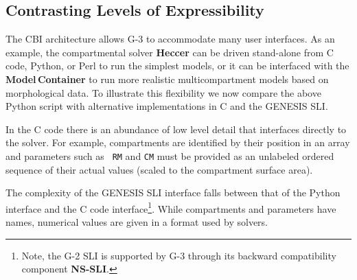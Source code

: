 \documentclass[10pt]{article}
\begin{document}
\subsection*{Contrasting Levels of Expressibility}

The CBI architecture allows G-3 to accommodate many user
interfaces.  As an example, the compartmental solver {\bf Heccer} can be driven
stand-alone from C code, Python, or Perl to run the simplest
models, or it can be interfaced with the {\bf Model\,Container} to
run more realistic multicompartment models based on morphological
data. To illustrate this flexibility we now compare the above Python
script with alternative implementations in C and the GENESIS SLI.

In the C code there is an abundance of low level detail that
interfaces directly to the solver.  For example, compartments are
identified by their position in an array and parameters such as {\tt
  RM} and {\tt CM} must be provided as an unlabeled ordered sequence
of their actual values (scaled to the compartment surface area).

The complexity of the GENESIS SLI interface falls between that of the
Python interface and the C code interface\footnote{Note,
 the G-2 SLI is supported by G-3 through its backward compatibility
  component {\bf NS-SLI}.}.  While
compartments and parameters have names, numerical values are given in
a format used by solvers.
\end{document}
